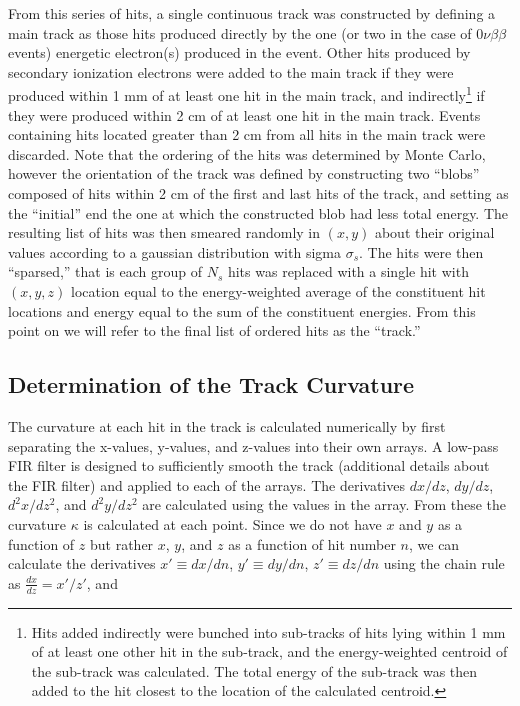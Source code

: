\documentclass{JINST}
\begin{document}
From this series of hits, a single continuous track was constructed by defining a main track as those hits produced directly by the one (or two in the case of $0\nu\beta\beta$ events) energetic electron(s) produced in the event.  Other hits produced by secondary ionization electrons were added to the main track if they were produced within 1 mm of at least one hit in the main track, and indirectly\footnote{Hits added indirectly were bunched into sub-tracks of hits lying within 1 mm of at least one other hit in the sub-track, and the energy-weighted centroid of the sub-track was calculated.  The total energy of the sub-track was then added to the hit closest to the location of the calculated centroid.} if they were produced within 2 cm of at least one hit in the main track.  Events containing hits located greater than 2 cm from all hits in the main track were discarded.  Note that the ordering of the hits was determined by Monte Carlo, however the orientation of the track was defined by constructing two ``blobs'' composed of hits within 2 cm of the first and last hits of the track, and setting as the ``initial'' end the one at which the constructed blob had less total energy.  The resulting list of hits was then smeared randomly in $(x,y)$ about their original values according to a gaussian distribution with sigma $\sigma_{s}$.  The hits were then ``sparsed,'' that is each group of $N_{s}$ hits was replaced with a single hit with $(x,y,z)$ location equal to the energy-weighted average of the constituent hit locations and energy equal to the sum of the constituent energies.  From this point on we will refer to the final list of ordered hits as the ``track.''

\subsection{Determination of the Track Curvature}
The curvature at each hit in the track is calculated numerically by first separating the x-values, y-values, and z-values into their own arrays.  A low-pass FIR filter is designed to sufficiently smooth the track (additional details about the FIR filter) and applied to each of the arrays.  The derivatives $dx/dz$, $dy/dz$, $d^2x/dz^2$, and $d^2y/dz^2$ are calculated using the values in the array.  From these the curvature $\kappa$ is calculated at each point.  Since we do not have $x$ and $y$ as a function of $z$ but rather $x$, $y$, and $z$ as a function of hit number $n$, we can calculate the derivatives $x' \equiv dx/dn$, $y' \equiv dy/dn$, $z' \equiv dz/dn$ using the chain rule as $\frac{dx}{dz} = x'/z'$, and
\end{document}
